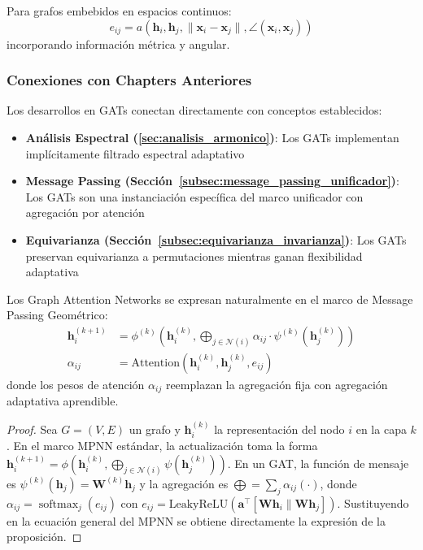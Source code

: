 \begin{definition}\label{def:continuous_geometric_attention}
Para grafos embebidos en espacios continuos:
\begin{equation}
    e_{ij} = a(\mathbf{h}_i, \mathbf{h}_j, \|\mathbf{x}_i - \mathbf{x}_j\|, \angle(\mathbf{x}_i, \mathbf{x}_j))
    \label{eq:continuous_geometric_attention}
\end{equation}
incorporando información métrica y angular.
\end{definition}

\subsubsection{Conexiones con Chapters Anteriores}

Los desarrollos en GATs conectan directamente con conceptos establecidos:

\begin{itemize}
    \item \textbf{Análisis Espectral (\autoref{sec:analisis_armonico})}: Los GATs implementan implícitamente filtrado espectral adaptativo
    \item \textbf{Message Passing (Sección~\ref{subsec:message_passing_unificador})}: Los GATs son una instanciación específica del marco unificador con agregación por atención
    \item \textbf{Equivarianza (Sección~\ref{subsec:equivarianza_invarianza})}: Los GATs preservan equivarianza a permutaciones mientras ganan flexibilidad adaptativa
\end{itemize}

\begin{proposition}\label{prop:gat_unified_framework}
Los Graph Attention Networks se expresan naturalmente en el marco de Message Passing Geométrico:
\begin{align}
    \mathbf{h}_i^{(k+1)} &= \phi^{(k)}\left(\mathbf{h}_i^{(k)}, \bigoplus_{j \in \mathcal{N}(i)} \alpha_{ij} \cdot \psi^{(k)}(\mathbf{h}_j^{(k)})\right) \\
    \alpha_{ij} &= \text{Attention}(\mathbf{h}_i^{(k)}, \mathbf{h}_j^{(k)}, e_{ij})
    \label{eq:gat_in_unified_framework}
\end{align}
donde los pesos de atención $\alpha_{ij}$ reemplazan la agregación fija con agregación adaptativa aprendible.
\end{proposition}

\begin{proof}
Sea $G = (V, E)$ un grafo y $\mathbf{h}_i^{(k)}$ la representación del nodo $i$ en la capa $k$. En el marco MPNN estándar, la actualización toma la forma $\mathbf{h}_i^{(k+1)} = \phi(\mathbf{h}_i^{(k)}, \bigoplus_{j \in \mathcal{N}(i)} \psi(\mathbf{h}_j^{(k)}))$. En un GAT, la función de mensaje es $\psi^{(k)}(\mathbf{h}_j) = \mathbf{W}^{(k)} \mathbf{h}_j$ y la agregación es $\bigoplus = \sum_{j} \alpha_{ij} (\cdot)$, donde $\alpha_{ij} = \operatorname{softmax}_j(e_{ij})$ con $e_{ij} = \text{LeakyReLU}(\mathbf{a}^\top [\mathbf{W}\mathbf{h}_i \| \mathbf{W}\mathbf{h}_j])$. Sustituyendo en la ecuación general del MPNN se obtiene directamente la expresión de la proposición.
\end{proof}

